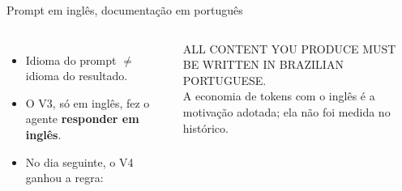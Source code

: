 \documentclass[aspectratio=169,11pt]{beamer}
\begin{document}
\begin{frame}{Prompt em inglês, documentação em português}
\begin{columns}[c]
\centering
{}
\begin{itemize}\small
  \item Idioma do prompt \(\neq\) idioma do resultado.
  \item O V3, só em inglês, fez o agente \textbf{responder em inglês}.
  \item No dia seguinte, o V4 ganhou a regra:
\end{itemize}
{\footnotesize\ttfamily\color{azulMB} ALL CONTENT YOU PRODUCE MUST BE WRITTEN IN BRAZILIAN PORTUGUESE.}\\[3mm]
{\scriptsize\color{azulMedio} A economia de tokens com o inglês é a motivação adotada; ela não foi medida no histórico.}
\end{columns}
\end{frame}
\end{document}
